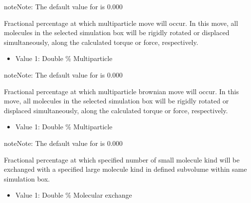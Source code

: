 \documentclass[letterpaper,10pt,english]{sphinxmanual}
\begin{document}
\begin{description}
\begin{itemize}
\end{itemize}

\begin{sphinxadmonition}{note}{Note:}
\sphinxAtStartPar
The default value for  is 0.000
\end{sphinxadmonition}

\item[{\sphinxcode{\sphinxupquote{MultiParticleFreq}}}] \leavevmode
\sphinxAtStartPar
Fractional percentage at which multi\sphinxhyphen{}particle move will occur. In this move, all molecules in the selected simulation box will be rigidly rotated or displaced
simultaneously, along the calculated torque or force, respectively.
\begin{itemize}
\item {} 
\sphinxAtStartPar
Value 1: Double \sphinxhyphen{} \% Multiparticle

\end{itemize}

\begin{sphinxadmonition}{note}{Note:}
\sphinxAtStartPar
The default value for  is 0.000
\end{sphinxadmonition}

\item[{\sphinxcode{\sphinxupquote{MultiParticleBrownianFreq}}}] \leavevmode
\sphinxAtStartPar
Fractional percentage at which multi\sphinxhyphen{}particle brownian move will occur. In this move, all molecules in the selected simulation box will be rigidly rotated or displaced
simultaneously, along the calculated torque or force, respectively.
\begin{itemize}
\item {} 
\sphinxAtStartPar
Value 1: Double \sphinxhyphen{} \% Multiparticle

\end{itemize}

\begin{sphinxadmonition}{note}{Note:}
\sphinxAtStartPar
The default value for  is 0.000
\end{sphinxadmonition}

\item[{\sphinxcode{\sphinxupquote{IntraMEMC\sphinxhyphen{}1Freq}}}] \leavevmode
\sphinxAtStartPar
Fractional percentage at which specified number of small molecule kind will be exchanged with a specified large molecule kind in defined sub\sphinxhyphen{}volume within same simulation box.
\begin{itemize}
\item {} 
\sphinxAtStartPar
Value 1: Double \sphinxhyphen{} \% Molecular exchange


\end{itemize}
\end{description}
\end{document}
